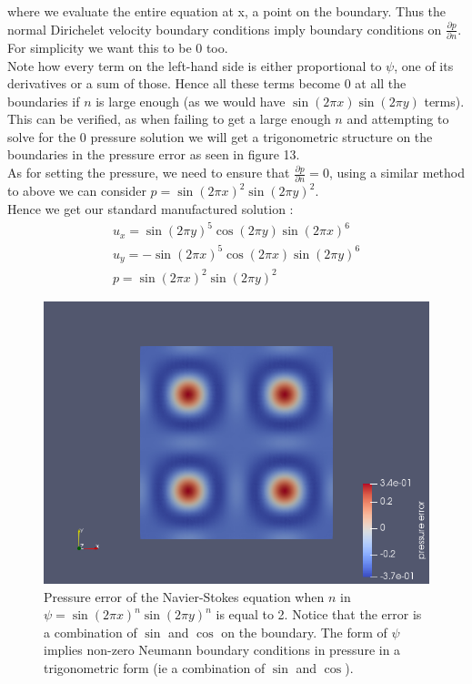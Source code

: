 \documentclass[11pt,twoside,a4paper]{article}
\begin{document}
where we evaluate the entire equation at x, a point on the boundary.
Thus the normal Dirichelet velocity boundary conditions imply boundary conditions on $\frac{\partial p}{\partial n}$.\\
For simplicity we want this to be $0$ too.\\
Note how every term on the left-hand side is either proportional to $\psi$, one of its derivatives or a sum of those. Hence all these terms become $0$ at all the boundaries if $n$ is large enough (as we would have $ \sin(2 \pi x) \sin(2 \pi y)$ terms).\\
This can be verified, as when failing to get a large enough $n$ and attempting to solve for the $0$ pressure solution we will get a trigonometric structure on the boundaries in the pressure error as seen in figure 13.\\
As for setting the pressure, we need to ensure that $\frac{\partial p} {\partial n} = 0$, using a similar method to above we can consider $p =  \sin(2 \pi x)^2 \sin(2 \pi y)^2$.\\
Hence we get our standard manufactured solution :
\begin{align}
u_x = \sin(2 \pi y)^5 \cos(2 \pi y)\sin(2 \pi x)^6 \\
u_y= -\sin(2 \pi x)^5 \cos(2 \pi x) \sin(2 \pi y)^6 \\
p = \sin(2 \pi x)^2 \sin(2 \pi y)^2
\end{align}

\begin{figure}
  \includegraphics[width=\linewidth]{badpbdc.png}
  \caption{Pressure error of the Navier-Stokes equation when $n$ in $\psi = \sin(2 \pi x)^n \sin(2 \pi y)^n$  is equal to 2. Notice that the error is a combination of $\sin$ and $\cos$ on the boundary. The form of $\psi$ implies non-zero Neumann boundary conditions in pressure in a trigonometric form (ie a combination of $\sin$  and $\cos$).}
\end{figure}
\end{document}
